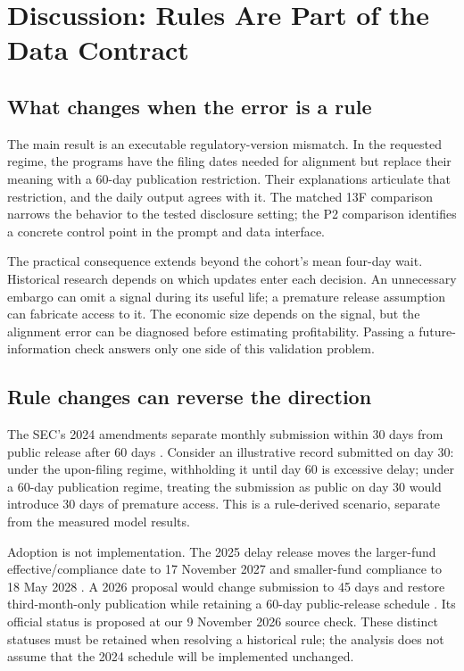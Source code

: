 \documentclass[10pt,twocolumn,a4paper]{article}
\begin{document}
\section{Discussion: Rules Are Part of the Data Contract}
\subsection{What changes when the error is a rule}
The main result is an executable regulatory-version mismatch. In the requested regime, the programs have the filing dates needed for alignment but replace their meaning with a 60-day publication restriction. Their explanations articulate that restriction, and the daily output agrees with it. The matched 13F comparison narrows the behavior to the tested disclosure setting; the P2 comparison identifies a concrete control point in the prompt and data interface.

The practical consequence extends beyond the cohort's mean four-day wait. Historical research depends on which updates enter each decision. An unnecessary embargo can omit a signal during its useful life; a premature release assumption can fabricate access to it. The economic size depends on the signal, but the alignment error can be diagnosed before estimating profitability. Passing a future-information check answers only one side of this validation problem.

\subsection{Rule changes can reverse the direction}
\label{sec:regime}
The SEC's 2024 amendments separate monthly submission within 30 days from public release after 60 days \citep[pp.\ 14, 32]{sec2024}. Consider an illustrative record submitted on day 30: under the upon-filing regime, withholding it until day 60 is excessive delay; under a 60-day publication regime, treating the submission as public on day 30 would introduce 30 days of premature access. This is a rule-derived scenario, separate from the measured model results.

Adoption is not implementation. The 2025 delay release moves the larger-fund effective/compliance date to 17 November 2027 and smaller-fund compliance to 18 May 2028 \citep{sec2025delay}. A 2026 proposal would change submission to 45 days and restore third-month-only publication while retaining a 60-day public-release schedule \citep[Table~1, p.\ 9]{sec2026proposal}. Its official status is proposed at our 9 November 2026 source check. These distinct statuses must be retained when resolving a historical rule; the analysis does not assume that the 2024 schedule will be implemented unchanged.
\end{document}
